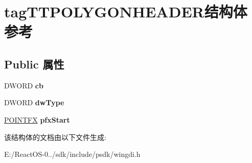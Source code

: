 \hypertarget{structtag_t_t_p_o_l_y_g_o_n_h_e_a_d_e_r}{}\section{tag\+T\+T\+P\+O\+L\+Y\+G\+O\+N\+H\+E\+A\+D\+E\+R结构体 参考}
\label{structtag_t_t_p_o_l_y_g_o_n_h_e_a_d_e_r}
\subsection*{Public 属性}
\begin{DoxyCompactItemize}
\item 
\mbox{\label{structtag_t_t_p_o_l_y_g_o_n_h_e_a_d_e_r_a5029ac96c60b522b94057a6ba3ba9fc7}} 
D\+W\+O\+RD {\bfseries cb}
\item 
\mbox{\label{structtag_t_t_p_o_l_y_g_o_n_h_e_a_d_e_r_a172458a8b8d016ef77e6e5838ef76d47}} 
D\+W\+O\+RD {\bfseries dw\+Type}
\item 
\mbox{\label{structtag_t_t_p_o_l_y_g_o_n_h_e_a_d_e_r_aead4588f181d2380445bc3b173be1bff}} 
\hyperlink{structtag_p_o_i_n_t_f_x}{P\+O\+I\+N\+T\+FX} {\bfseries pfx\+Start}
\end{DoxyCompactItemize}


该结构体的文档由以下文件生成\+:\begin{DoxyCompactItemize}
\item 
E\+:/\+React\+O\+S-\/0../sdk/include/psdk/wingdi.\+h\end{DoxyCompactItemize}
